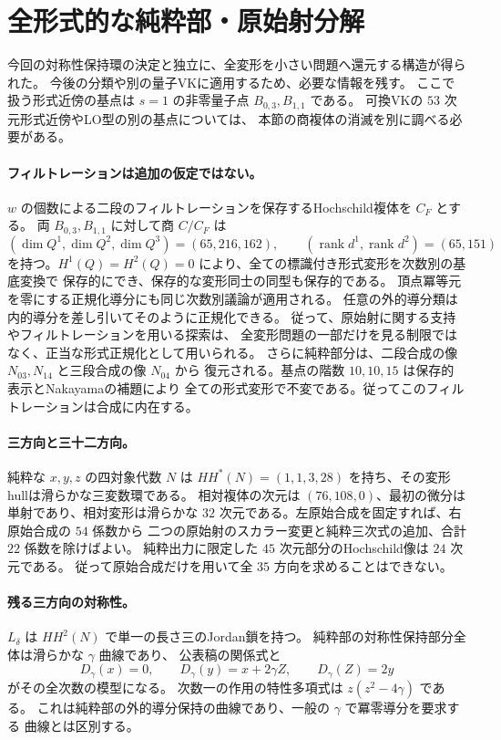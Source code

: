 \section{全形式的な純粋部・原始射分解}
\label{sec:vk-filtered-reduction-notes-v39}

今回の対称性保持環の決定と独立に、全変形を小さい問題へ還元する構造が得られた。
今後の分類や別の量子VKに適用するため、必要な情報を残す。
ここで扱う形式近傍の基点は $s=1$ の非零量子点 $B_{0,3},B_{1,1}$ である。
可換VKの $53$ 次元形式近傍やLO型の別の基点については、
本節の商複体の消滅を別に調べる必要がある。

\paragraph{フィルトレーションは追加の仮定ではない。}
$w$ の個数による二段のフィルトレーションを保存するHochschild複体を $C_F$ とする。
両 $B_{0,3},B_{1,1}$ に対して商 $C/C_F$ は
\[
 (\dim Q^1,\dim Q^2,\dim Q^3)=(65,216,162),\qquad
 (\operatorname{rank}d^1,\operatorname{rank}d^2)=(65,151)
\]
を持つ。$H^1(Q)=H^2(Q)=0$ により、全ての標識付き形式変形を次数別の基底変換で
保存的にでき、保存的な変形同士の同型も保存的である。
頂点冪等元を零にする正規化導分にも同じ次数別議論が適用される。
任意の外的導分類は内的導分を差し引いてそのように正規化できる。
従って、原始射に関する支持やフィルトレーションを用いる探索は、
全変形問題の一部だけを見る制限ではなく、正当な形式正規化として用いられる。
さらに純粋部分は、二段合成の像 $N_{03},N_{14}$ と三段合成の像 $N_{04}$ から
復元される。基点の階数 $10,10,15$ は保存的表示とNakayamaの補題により
全ての形式変形で不変である。従ってこのフィルトレーションは合成に内在する。

\paragraph{三方向と三十二方向。}
純粋な $x,y,z$ の四対象代数 $N$ は
$HH^*(N)=(1,1,3,28)$ を持ち、その変形hullは滑らかな三変数環である。
相対複体の次元は $(76,108,0)$、最初の微分は単射であり、相対変形は滑らかな
$32$ 次元である。左原始合成を固定すれば、右原始合成の $54$ 係数から
二つの原始射のスカラー変更と純粋三次式の追加、合計 $22$ 係数を除けばよい。
純粋出力に限定した $45$ 次元部分のHochschild像は $24$ 次元である。
従って原始合成だけを用いて全 $35$ 方向を求めることはできない。

\paragraph{残る三方向の対称性。}
$L_\delta$ は $HH^2(N)$ で単一の長さ三のJordan鎖を持つ。
純粋部の対称性保持部分全体は滑らかな $\gamma$ 曲線であり、
公表稿の関係式と
\[
 D_\gamma(x)=0,\qquad D_\gamma(y)=x+2\gamma Z,\qquad
 D_\gamma(Z)=2y
\]
がその全次数の模型になる。
次数一の作用の特性多項式は $z(z^2-4\gamma)$ である。
これは純粋部の外的導分保持の曲線であり、一般の $\gamma$ で冪零導分を要求する
曲線とは区別する。


